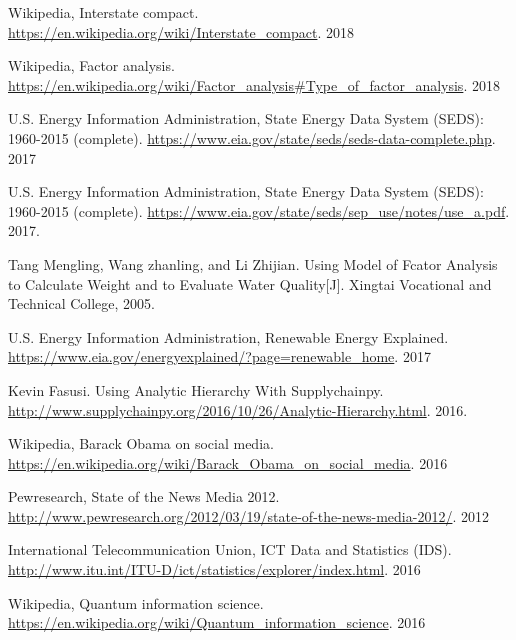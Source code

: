 \documentclass[a4paper,11pt]{article}
\begin{document}
\newpage%
\thispagestyle{empty}%
\begin{thebibliography}{}
%
%
Wikipedia, Interstate compact. \url{https://en.wikipedia.org/wiki/Interstate_compact}. 2018

Wikipedia, Factor analysis. \url{https://en.wikipedia.org/wiki/Factor_analysis#Type_of_factor_analysis}. 2018

U.S. Energy Information Administration, State Energy Data System (SEDS): 1960-2015 (complete). \url{https://www.eia.gov/state/seds/seds-data-complete.php}. 2017

U.S. Energy Information Administration, State Energy Data System (SEDS): 1960-2015 (complete). \url{https://www.eia.gov/state/seds/sep_use/notes/use_a.pdf}. 2017.

Tang Mengling, Wang zhanling, and Li Zhijian. Using Model of Fcator Analysis to Calculate Weight and to Evaluate Water Quality[J]. Xingtai Vocational and Technical College, 2005.

U.S. Energy Information Administration, Renewable Energy Explained. \url{https://www.eia.gov/energyexplained/?page=renewable_home}. 2017



Kevin Fasusi. Using Analytic Hierarchy With Supplychainpy. \url{http://www.supplychainpy.org/2016/10/26/Analytic-Hierarchy.html}. 2016.

Wikipedia, Barack Obama on social media. \url{https://en.wikipedia.org/wiki/Barack_Obama_on_social_media}. 2016


Pewresearch, State of the News Media 2012. \url{http://www.pewresearch.org/2012/03/19/state-of-the-news-media-2012/}. 2012

International Telecommunication Union, ICT Data and Statistics (IDS). \url{http://www.itu.int/ITU-D/ict/statistics/explorer/index.html}. 2016

Wikipedia, Quantum information science. \url{https://en.wikipedia.org/wiki/Quantum_information_science}. 2016
\end{thebibliography}
\end{document}
